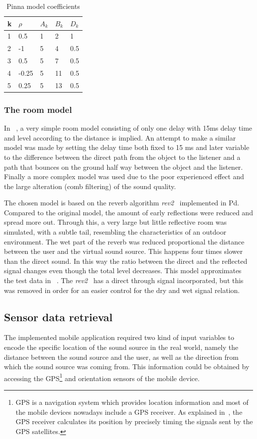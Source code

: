 \documentclass[journal]{IEEEtran}
\begin{document}
\begin{table}[h]
\centering
\caption{Pinna model coefficients}
\label{PinnaModel parameters}
\begin{tabular}{|l|l|l|l|l|}
\hline
k & $\rho$ & $A_{k}$ & $B_{k}$ & $D_{k}$ \\ \hline
1 & 0.5 & 1 & 2 & 1 \\ \hline
2 & -1 & 5 & 4 & 0.5 \\ \hline
3 & 0.5 & 5 & 7 & 0.5 \\ \hline
4 & -0.25 & 5 & 11 & 0.5 \\ \hline
5 & 0.25 & 5 & 13 & 0.5 \\ \hline
\end{tabular}
\end{table}



\subsubsection{The room model}
In ~\cite{Brown1997}, a very simple room model consisting of only one delay with 15ms delay time and level according to the distance is implied. An attempt to make a similar model was made by setting the delay time both fixed to 15 ms and later variable to the difference between the direct path from the object to the listener and a path that bounces on the ground half way between the object and the listener. Finally a more complex model was used due to the poor experienced effect and the large alteration (comb filtering) of the sound quality.

The chosen model is based on the reverb algorithm \textit{rev2~} implemented in Pd. Compared to the original model, the amount of early reflections were reduced and spread more out. Through this, a very large but little reflective room was simulated, with a subtle tail, resembling the characteristics of an outdoor environment. The wet part of the reverb was reduced proportional the distance between the user and the virtual sound source. This happens four times slower than the direct sound. In this way the ratio between the direct and the reflected signal changes even though the total level decreases. This model approximates the test data in ~\cite{begault19943}. The \textit{rev2~} has a direct through signal incorporated, but this was removed in order for an easier control for the dry and wet signal relation.


\subsection{Sensor data retrieval}
The implemented mobile application required two kind of input variables to encode the specific location of the sound source in the real world, namely the distance between the sound source and the user, as well as the direction from which the sound source was coming from. This information could be obtained by accessing the GPS\footnote{GPS is a navigation system which provides location information and most of the mobile devices nowadays include a GPS receiver. As explained in~\cite{noble2009}, the GPS receiver calculates its position by precisely timing the signals sent by the GPS satellites.} and orientation sensors of the mobile device. 
\end{document}
